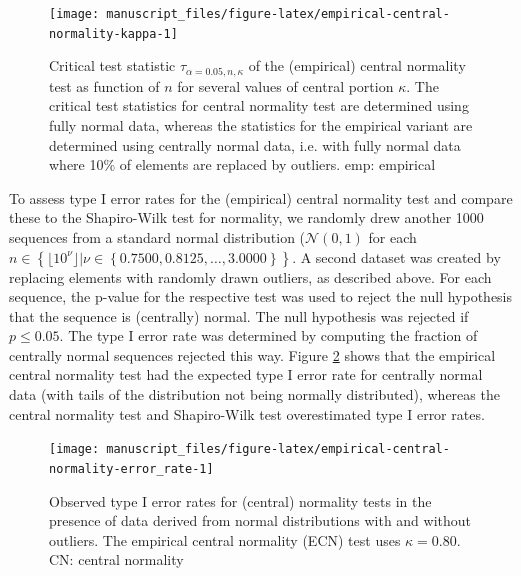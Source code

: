 \documentclass[
  a4paper,
]{article}
\begin{document}
\begin{figure}

{\centering \texttt{[image: manuscript\_files/figure-latex/empirical-central-normality-kappa-1]} 

}

\caption{Critical test statistic $\tau_{\alpha = 0.05, n, \kappa}$ of the (empirical) central normality test as function of $n$ for several values of central portion $\kappa$. The critical test statistics for central normality test are determined using fully normal data, whereas the statistics for the empirical variant are determined using centrally normal data, i.e. with fully normal data where 10\% of elements are replaced by outliers. emp: empirical}\label{fig:empirical-central-normality-kappa}
\end{figure}

To assess type I error rates for the (empirical) central normality test
and compare these to the Shapiro-Wilk test for normality, we randomly
drew another 1000 sequences from a standard normal distribution
(\(\mathcal{N}(0,1)\) for each
\(n \in \left\{\lfloor 10^\nu \rfloor | \nu \in \left\{0.7500, 0.8125, \ldots, 3.0000 \right \} \right\}\).
A second dataset was created by replacing elements with randomly drawn
outliers, as described above. For each sequence, the p-value for the
respective test was used to reject the null hypothesis that the sequence
is (centrally) normal. The null hypothesis was rejected if
\(p \leq 0.05\). The type I error rate was determined by computing the
fraction of centrally normal sequences rejected this way. Figure
\ref{fig:empirical-central-normality-error_rate} shows that the
empirical central normality test had the expected type I error rate for
centrally normal data (with tails of the distribution not being normally
distributed), whereas the central normality test and Shapiro-Wilk test
overestimated type I error rates.

\begin{figure}

{\centering \texttt{[image: manuscript\_files/figure-latex/empirical-central-normality-error\_rate-1]} 

}

\caption{Observed type I error rates for (central) normality tests in the presence of data derived from normal distributions with and without outliers. The empirical central normality (ECN) test uses $\kappa = 0.80$. CN: central normality}\label{fig:empirical-central-normality-error_rate}
\end{figure}
\end{document}
